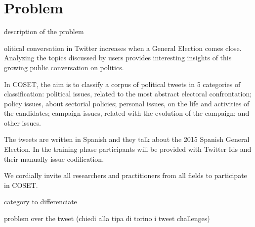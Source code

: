 \section{Problem} \label{sec:problem}

description of the problem

olitical conversation in Twitter increases when a General Election comes close. Analyzing the topics discussed by users provides interesting insights of this growing public conversation on politics.

In COSET, the aim is to classify a corpus of political tweets in 5 categories of classification: political issues, related to the most abstract electoral confrontation; policy issues, about sectorial policies; personal issues, on the life and activities of the candidates; campaign issues, related with the evolution of the campaign; and other issues.

The tweets are written in Spanish and they talk about the 2015 Spanish General Election. In the training phase participants will be provided with Twitter Ids and their manually issue codification.

We cordially invite all researchers and practitioners from all fields to participate in COSET.

category to differenciate

problem over the tweet (chiedi alla tipa di torino i tweet challenges)